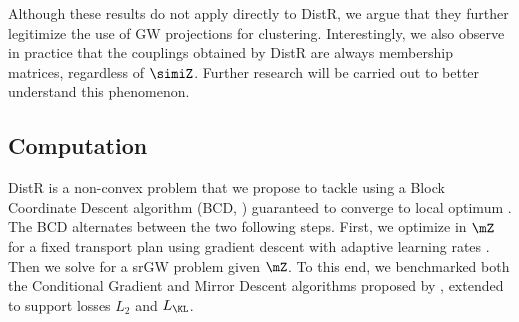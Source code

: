 Although these results do not apply directly to DistR, we argue that they further legitimize the use of GW projections for clustering. Interestingly, we also observe in practice that the couplings obtained by DistR are always membership matrices, regardless of $\simiZ$. Further research will be carried out to better understand this phenomenon. 


\subsection{Computation}\label{sec:computation_GW}

DistR is a non-convex problem that we propose to tackle using a Block Coordinate Descent algorithm (BCD, \citealt{tseng2001convergence}) guaranteed to converge to local optimum \citep{grippo2000convergence, Lyu2023bmm}. The BCD alternates between the two following steps. First, we optimize in $\mZ$ for a fixed transport plan using gradient descent with adaptive learning rates \citep{kingma2014adam}. Then we solve for a srGW problem given $\mZ$. To this end, we benchmarked both the Conditional Gradient and Mirror Descent algorithms proposed by \citet{vincent2021semi}, extended to support losses $L_2$ and $L_{\KL}$.

